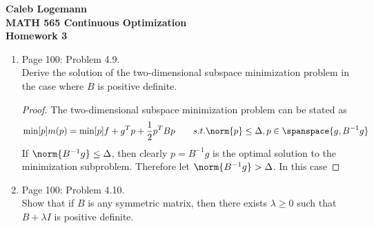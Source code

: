 \documentclass[11pt, oneside]{article}
\begin{document}
\noindent \textbf{\Large{Caleb Logemann \\
MATH 565 Continuous Optimization \\
Homework 3
}}

%
\begin{enumerate}
  \item %
    Page 100: Problem 4.9. \\
    Derive the solution of the two-dimensional subspace minimization problem in
    the case where $B$ is positive definite.

    \begin{proof}
      The two-dimensional subspace minimization problem can be stated as
      \[
        \min[p]{m(p)} = \min[p]{f + g^T p + \frac{1}{2} p^T B p} \qquad s.t. \norm{p} \le \Delta, p \in \spanspace{g, B^{-1} g}
      \]
      If $\norm{B^{-1} g} \le \Delta$, then clearly $p = B^{-1} g$ is the optimal
      solution to the minimization subproblem.
      Therefore let $\norm{B^{-1} g} > \Delta$.
      In this case
    \end{proof}

  \item %
    Page 100: Problem 4.10. \\
    Show that if $B$ is any symmetric matrix, then there exists $\lambda \ge 0$
    such that $B + \lambda I$ is positive definite.


\end{enumerate}
\end{document}
